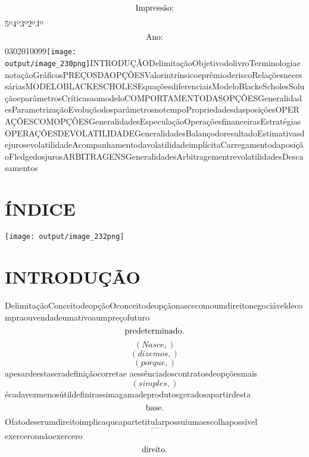 \documentclass{article}
\begin{document}
\begin{equation}
$Impressão:$
\end{equation}5º4º3º2ºJº\begin{equation}
$Ano:$
\end{equation}0302010099\texttt{[image: output/image\_230png]}INTRODUÇÃODelimitaçãoObjetivodolivroTerminologiaenotaçãoGráficosPREÇOSDAOPÇÕESValorintrínsicoeprêmioderiscoRelaçõesnecessáriasMODELOBLACKESCHOLESEquaçõesdiferenciaisModeloBlackeScholesSoluçãoeparâmetrosCríticasaomodeloCOMPORTAMENTODASOPÇÕESGeneralidadesParametrizaçãoEvoluçãodosparâmetrosnotempoPropriedadesdasposiçõesOPERAÇÕESCOMOPÇÕESGeneralidadesEspeculaçãoOperaçõesfinanceirasEstratégiasOPERAÇÕESDEVOLATILIDADEGeneralidadesBalançodoresultadoEstimativasdejurosevolatilidadeAcompanhamentodavolatilidadeimplícitaCarregamentodaposiçãoFledgedosjurosARBITRAGENSGeneralidadesArbitragementrevolatilidadesDescasamentos\section{ÍNDICE}\texttt{[image: output/image\_232png]}\section{INTRODUÇÃO}DelimitaçãoConceitodeopçãoOconceitodeopçãonascecomoumdireitonegociáveldecompraouvendadeumativoaumpreçofuturo\begin{equation}
$predeterminado.$
\end{equation}\begin{equation}
\left( Nasce,\right)
\end{equation}\begin{equation}
\left( dizemos,\right)
\end{equation}\begin{equation}
\left( porque,\right)
\end{equation}apesardeestaseradefiniçãocorretae aessênciadoscontratosdeopçõesmais\begin{equation}
\left( simples,\right)
\end{equation}écadavezmenosútildefinirassimagamadeprodutosgeradosapartirdesta\begin{equation}
$base.$
\end{equation}Ofatodeserumdireitoimplicaqueapartetitularpossuiumaescolhapossível\begin{equation}
—
\end{equation}exercerounãoexercero\begin{equation}
$direito.$
\end{equation}\begin{equation}

\end{equation}
\end{document}
